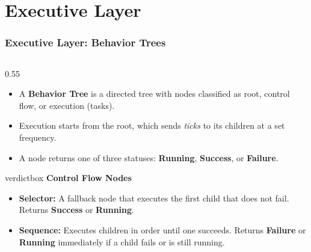 \documentclass[10pt]{beamer}
\begin{document}
\section{Executive Layer}
\begin{frame}
    \frametitle{Executive Layer: Behavior Trees}
    \begin{columns}[T]
        \begin{column}{0.55\textwidth}
            \small
            \begin{itemize}
                \item A \textbf{Behavior Tree} is a directed tree with nodes classified as root, control flow, or execution (tasks).
                \item Execution starts from the root, which sends \textit{ticks} to its children at a set frequency.
                \item A node returns one of three statuses: \textbf{Running}, \textbf{Success}, or \textbf{Failure}.
            \end{itemize}
            
            \vspace{0.3cm}
            
            \begin{beamercolorbox}[sep=4pt,shadow=true,rounded=true]{verdictbox}
                \centering \textbf{Control Flow Nodes} \\
                \vspace{0.1cm}
                \raggedright
                \footnotesize
                \begin{itemize}
                    \setlength\itemsep{0.3em}
                    \item \textbf{Selector:} A fallback node that executes the first child that does not fail. Returns \textbf{Success} or \textbf{Running}.
                    \item \textbf{Sequence:} Executes children in order until one succeeds. Returns \textbf{Failure} or \textbf{Running} immediately if a child fails or is still running.
                \end{itemize}
            \end{beamercolorbox}
        \end{column}
        

\end{columns}
\end{frame}
\end{document}

